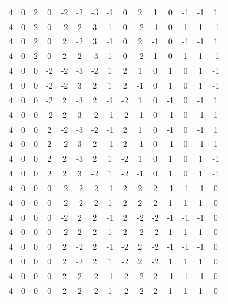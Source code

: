 \documentclass[aps,english,10pt,superscriptaddress,onecolumn,twoside,longbibliography,pra,floatfix,fleqn,nofootinbib]{revtex4-1}%
\theoremstyle{definition}
\begin{document}
{\begin{table}[hb]
{\begin{tabular}{c@{\hspace{1em}}ccc@{\hspace{1em}}ccc@{\hspace{1em}}c@{\hspace{1em}}ccc@{\hspace{1em}}ccc@{\hspace{1em}}c}
 4 & 0 & 2 & 0 & -2 & -2 & -3 & -1 & 0 & 2 & 1 & 0 & -1 & -1 & 1 \\
 4 & 0 & 2 & 0 & -2 & 2 & 3 & 1 & 0 & -2 & -1 & 0 & 1 & 1 & -1 \\
 4 & 0 & 2 & 0 & 2 & -2 & 3 & -1 & 0 & 2 & -1 & 0 & -1 & -1 & 1 \\
 4 & 0 & 2 & 0 & 2 & 2 & -3 & 1 & 0 & -2 & 1 & 0 & 1 & 1 & -1 \\
 4 & 0 & 0 & -2 & -2 & -3 & -2 & 1 & 2 & 1 & 0 & 1 & 0 & 1 & -1 \\
 4 & 0 & 0 & -2 & -2 & 3 & 2 & 1 & 2 & -1 & 0 & 1 & 0 & 1 & -1 \\
 4 & 0 & 0 & -2 & 2 & -3 & 2 & -1 & -2 & 1 & 0 & -1 & 0 & -1 & 1 \\
 4 & 0 & 0 & -2 & 2 & 3 & -2 & -1 & -2 & -1 & 0 & -1 & 0 & -1 & 1 \\
 4 & 0 & 0 & 2 & -2 & -3 & -2 & -1 & 2 & 1 & 0 & -1 & 0 & -1 & 1 \\
 4 & 0 & 0 & 2 & -2 & 3 & 2 & -1 & 2 & -1 & 0 & -1 & 0 & -1 & 1 \\
 4 & 0 & 0 & 2 & 2 & -3 & 2 & 1 & -2 & 1 & 0 & 1 & 0 & 1 & -1 \\
 4 & 0 & 0 & 2 & 2 & 3 & -2 & 1 & -2 & -1 & 0 & 1 & 0 & 1 & -1 \\
 4 & 0 & 0 & 0 & -2 & -2 & -2 & -1 & 2 & 2 & 2 & -1 & -1 & -1 & 0 \\
 4 & 0 & 0 & 0 & -2 & -2 & -2 & 1 & 2 & 2 & 2 & 1 & 1 & 1 & 0 \\
 4 & 0 & 0 & 0 & -2 & 2 & 2 & -1 & 2 & -2 & -2 & -1 & -1 & -1 & 0 \\
 4 & 0 & 0 & 0 & -2 & 2 & 2 & 1 & 2 & -2 & -2 & 1 & 1 & 1 & 0 \\
 4 & 0 & 0 & 0 & 2 & -2 & 2 & -1 & -2 & 2 & -2 & -1 & -1 & -1 & 0 \\
 4 & 0 & 0 & 0 & 2 & -2 & 2 & 1 & -2 & 2 & -2 & 1 & 1 & 1 & 0 \\
 4 & 0 & 0 & 0 & 2 & 2 & -2 & -1 & -2 & -2 & 2 & -1 & -1 & -1 & 0 \\
 4 & 0 & 0 & 0 & 2 & 2 & -2 & 1 & -2 & -2 & 2 & 1 & 1 & 1 & 0 \\
\end{tabular}}
\end{table}
}\vspace{-60ex}
\end{document}
